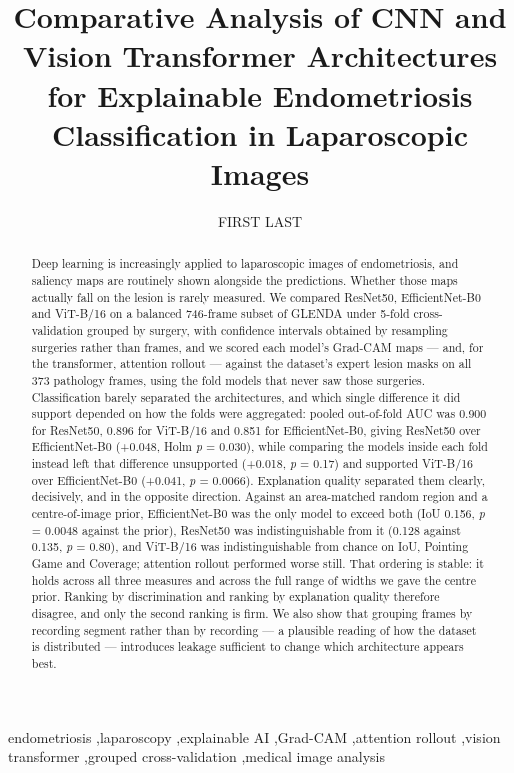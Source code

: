 \documentclass[preprint,12pt]{elsarticle}
\begin{document}
\begin{frontmatter}
\title{Comparative Analysis of CNN and Vision Transformer Architectures for Explainable Endometriosis Classification in Laparoscopic Images}
\author{FIRST LAST}

\begin{abstract}
Deep learning is increasingly applied to laparoscopic images of endometriosis, and saliency maps are routinely shown alongside the predictions. Whether those maps actually fall on the lesion is rarely measured. We compared ResNet50, EfficientNet-B0 and ViT-B/16 on a balanced 746-frame subset of GLENDA under 5-fold cross-validation grouped by surgery, with confidence intervals obtained by resampling surgeries rather than frames, and we scored each model's Grad-CAM maps --- and, for the transformer, attention rollout --- against the dataset's expert lesion masks on all 373 pathology frames, using the fold models that never saw those surgeries. Classification barely separated the architectures, and which single difference it did support depended on how the folds were aggregated: pooled out-of-fold AUC was 0.900 for ResNet50, 0.896 for ViT-B/16 and 0.851 for EfficientNet-B0, giving ResNet50 over EfficientNet-B0 (+0.048, Holm \emph{p} = 0.030), while comparing the models inside each fold instead left that difference unsupported (+0.018, \emph{p} = 0.17) and supported ViT-B/16 over EfficientNet-B0 (+0.041, \emph{p} = 0.0066). Explanation quality separated them clearly, decisively, and in the opposite direction. Against an area-matched random region and a centre-of-image prior, EfficientNet-B0 was the only model to exceed both (IoU 0.156, \emph{p} = 0.0048 against the prior), ResNet50 was indistinguishable from it (0.128 against 0.135, \emph{p} = 0.80), and ViT-B/16 was indistinguishable from chance on IoU, Pointing Game and Coverage; attention rollout performed worse still. That ordering is stable: it holds across all three measures and across the full range of widths we gave the centre prior. Ranking by discrimination and ranking by explanation quality therefore disagree, and only the second ranking is firm. We also show that grouping frames by recording segment rather than by recording --- a plausible reading of how the dataset is distributed --- introduces leakage sufficient to change which architecture appears best.
\end{abstract}

\begin{keyword}
endometriosis \sep laparoscopy \sep explainable AI \sep Grad-CAM \sep attention rollout \sep vision transformer \sep grouped cross-validation \sep medical image analysis
\end{keyword}
\end{frontmatter}
\end{document}
